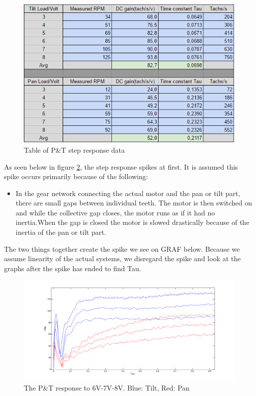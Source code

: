 \begin{figure}[h!]
\centering
\includegraphics[scale=0.6]{Billeder/PanTiltStepDataTable.png}
\caption{Table of P\&T step response data}
\label{fig:PanTiltStepDataTable}
\end{figure}

As seen below in figure \ref{fig:PTStepResponseGraph}, the step response spikes at first. It is assumed this spike occurs primarily because of the following:

\begin{itemize}
\item In the gear network connecting the actual motor and the pan or tilt part, there are small gaps between individual teeth. The motor is then switched on and while the collective gap closes, the motor runs as if it had no inertia.When the gap is closed the motor is slowed drastically because of the inertia of the pan or tilt part. 
\end{itemize}

The two things together create the spike we see on GRAF below. Because we assume linearity of the actual systems, we disregard the spike and look at the graphs after the spike has ended to find Tau.

\begin{figure}[h!]
\centering
\includegraphics[scale=0.35]{Billeder/PTStepResponseGraph.png}
\caption{The P\&T response to 6V-7V-8V. Blue: Tilt, Red: Pan}
\label{fig:PTStepResponseGraph}
\end{figure}

